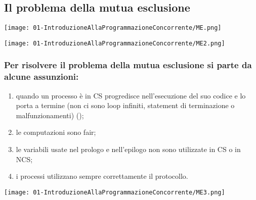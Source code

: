 \subsection{Il problema della mutua esclusione}



\begin{center}
    \texttt{[image: 01-IntroduzioneAllaProgrammazioneConcorrente/ME.png]}
\end{center}


\begin{center}
    \texttt{[image: 01-IntroduzioneAllaProgrammazioneConcorrente/ME2.png]}
\end{center}

\subsubsection{Per risolvere il problema della mutua esclusione si parte da alcune assunzioni:}

\begin{enumerate}
  \item quando un processo è in CS progredisce nell'esecuzione del suo codice e lo porta a termine (non ci sono loop infiniti, statement di terminazione o malfunzionamenti) ();
  \item le computazioni sono fair;
  \item le variabili usate nel prologo e nell'epilogo non sono utilizzate in CS o in NCS;
  \item i processi utilizzano sempre correttamente il protocollo.
\end{enumerate}


\begin{center}
    \texttt{[image: 01-IntroduzioneAllaProgrammazioneConcorrente/ME3.png]}
\end{center}


